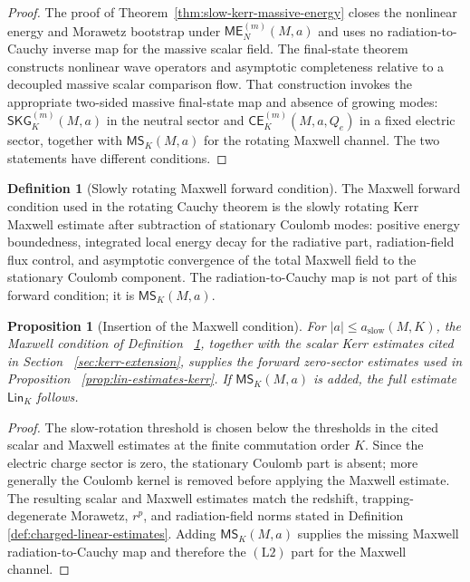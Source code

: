 \documentclass[11pt]{article}
\numberwithin{equation}{section}
\theoremstyle{plain}
\newtheorem{proposition}[theorem]{Proposition}
\theoremstyle{definition}
\newtheorem{definition}{Definition}[section]
\theoremstyle{remark}
\newcommand{\Lin}{\mathsf{Lin}}
\newcommand{\SKG}{\mathsf{SKG}}
\newcommand{\CElec}{\mathsf{CE}}
\newcommand{\ME}{\mathsf{ME}}
\newcommand{\MScat}{\mathsf{MS}}
\begin{document}
\begin{proof}
The proof of Theorem~\ref{thm:slow-kerr-massive-energy} closes the nonlinear energy and Morawetz bootstrap under \(\ME^{(m)}_N(M,a)\) and uses no radiation-to-Cauchy inverse map for the massive scalar field.  The final-state theorem constructs nonlinear wave operators and asymptotic completeness relative to a decoupled massive scalar comparison flow.  That construction invokes the appropriate two-sided massive final-state map and absence of growing modes: \(\SKG^{(m)}_K(M,a)\) in the neutral sector and \(\CElec^{(m)}_K(M,a,Q_e)\) in a fixed electric sector, together with \(\MScat_K(M,a)\) for the rotating Maxwell channel.  The two statements have different conditions.
\end{proof}

\begin{definition}[Slowly rotating Maxwell forward condition]\label{def:maxwell-teukolsky-condition}
The Maxwell forward condition used in the rotating Cauchy theorem is the slowly rotating Kerr Maxwell estimate after subtraction of stationary Coulomb modes: positive energy boundedness, integrated local energy decay for the radiative part, radiation-field flux control, and asymptotic convergence of the total Maxwell field to the stationary Coulomb component.  The radiation-to-Cauchy map is not part of this forward condition; it is \(\MScat_K(M,a)\).
\end{definition}

\begin{proposition}[Insertion of the Maxwell condition]\label{prop:slow-maxwell-interface}
For $|a|\le a_{\mathrm{slow}}(M,K)$, the Maxwell condition of Definition~
\ref{def:maxwell-teukolsky-condition}, together with the scalar Kerr estimates cited in Section~
\ref{sec:kerr-extension}, supplies the forward zero-sector estimates used in Proposition~
\ref{prop:lin-estimates-kerr}.  If \(\MScat_K(M,a)\) is added, the full estimate \(\Lin_K\) follows.
\end{proposition}

\begin{proof}
The slow-rotation threshold is chosen below the thresholds in the cited scalar and Maxwell estimates at the finite commutation order $K$.  Since the electric charge sector is zero, the stationary Coulomb part is absent; more generally the Coulomb kernel is removed before applying the Maxwell estimate.  The resulting scalar and Maxwell estimates match the redshift, trapping-degenerate Morawetz, $r^p$, and radiation-field norms stated in Definition~
\ref{def:charged-linear-estimates}.  Adding \(\MScat_K(M,a)\) supplies the missing Maxwell radiation-to-Cauchy map and therefore the \(\mathrm{(L2)}\) part for the Maxwell channel.
\end{proof}
\end{document}
